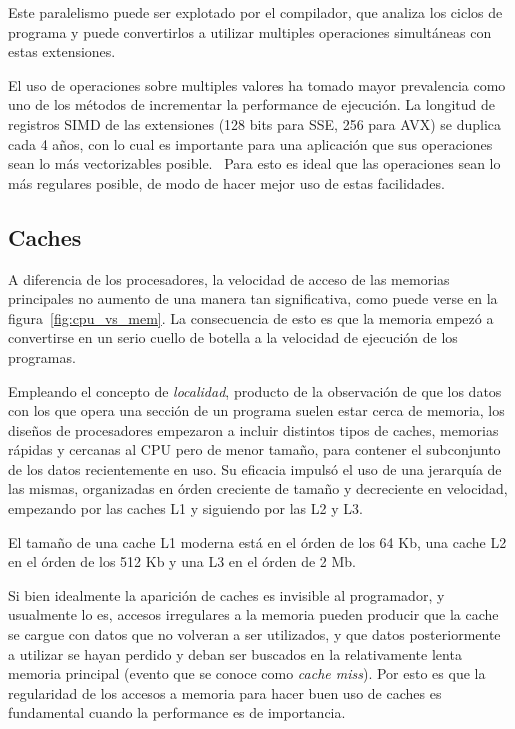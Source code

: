 Este paralelismo puede ser explotado por el compilador, que analiza los ciclos de programa y
puede convertirlos a utilizar multiples operaciones simult\'aneas con estas extensiones.

El uso de operaciones sobre multiples valores ha tomado mayor prevalencia como uno de los m\'etodos de incrementar
la performance de ejecuci\'on. La longitud de registros SIMD de las extensiones (128 bits para SSE, 256 para AVX) 
se duplica cada 4 a\~nos, con lo cual es importante para una aplicaci\'on que sus operaciones sean lo m\'as
vectorizables posible.~\cite{HennessyPatterson} Para esto es ideal que las operaciones sean lo m\'as regulares
posible, de modo de hacer mejor uso de estas facilidades.

\subsection{Caches}

A diferencia de los procesadores, la velocidad de acceso de las memorias principales no aumento de una manera
tan significativa, como puede verse en la figura~\ref{fig:cpu_vs_mem}. La consecuencia de esto es que la memoria
empez\'o a convertirse en un serio cuello de botella a la velocidad de ejecuci\'on de los programas.

Empleando el concepto de \textit{localidad}, producto de la observaci\'on de que los datos con los que opera una
secci\'on de un programa suelen estar cerca de memoria, los dise\~nos de procesadores empezaron a incluir distintos
tipos de caches, memorias r\'apidas y cercanas al CPU pero de menor tama\~no, para contener el subconjunto de los datos
recientemente en uso. Su eficacia impuls\'o el uso de una jerarqu\'ia de las mismas, organizadas en \'orden creciente
de tama\~no y decreciente en velocidad, empezando por las caches L1 y siguiendo por las L2 y L3.

El tama\~no de una cache L1 moderna est\'a en el \'orden de los 64 Kb, una cache L2 en el \'orden de los 512 Kb y
una L3 en el \'orden de 2 Mb. 

Si bien idealmente la aparici\'on de caches es invisible al programador, y usualmente lo es, accesos irregulares a la
memoria pueden producir que la cache se cargue con datos que no volveran a ser utilizados, y que datos posteriormente
a utilizar se hayan perdido y deban ser buscados en la relativamente lenta memoria principal (evento que se conoce como
\textit{cache miss}). Por esto es que la regularidad de los accesos a memoria para hacer buen uso de caches es
fundamental cuando la performance es de importancia.

